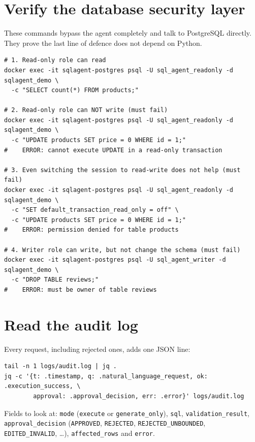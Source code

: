 \documentclass[11pt,a4paper]{article}
\begin{document}
\section{Verify the database security layer}

These commands bypass the agent completely and talk to PostgreSQL
directly. They prove the last line of defence does not depend on Python.

\begin{lstlisting}
# 1. Read-only role can read
docker exec -it sqlagent-postgres psql -U sql_agent_readonly -d sqlagent_demo \
  -c "SELECT count(*) FROM products;"

# 2. Read-only role can NOT write (must fail)
docker exec -it sqlagent-postgres psql -U sql_agent_readonly -d sqlagent_demo \
  -c "UPDATE products SET price = 0 WHERE id = 1;"
#    ERROR: cannot execute UPDATE in a read-only transaction

# 3. Even switching the session to read-write does not help (must fail)
docker exec -it sqlagent-postgres psql -U sql_agent_readonly -d sqlagent_demo \
  -c "SET default_transaction_read_only = off" \
  -c "UPDATE products SET price = 0 WHERE id = 1;"
#    ERROR: permission denied for table products

# 4. Writer role can write, but not change the schema (must fail)
docker exec -it sqlagent-postgres psql -U sql_agent_writer -d sqlagent_demo \
  -c "DROP TABLE reviews;"
#    ERROR: must be owner of table reviews
\end{lstlisting}

\section{Read the audit log}

Every request, including rejected ones, adds one JSON line:

\begin{lstlisting}
tail -n 1 logs/audit.log | jq .
jq -c '{t: .timestamp, q: .natural_language_request, ok: .execution_success, \
        approval: .approval_decision, err: .error}' logs/audit.log
\end{lstlisting}

Fields to look at: \texttt{mode} (\texttt{execute} or
\texttt{generate\_only}), \texttt{sql}, \texttt{validation\_result},
\texttt{approval\_decision} (\texttt{APPROVED}, \texttt{REJECTED},
\texttt{REJECTED\_UNBOUNDED}, \texttt{EDITED\_INVALID}, \dots),
\texttt{affected\_rows} and \texttt{error}.
\end{document}
